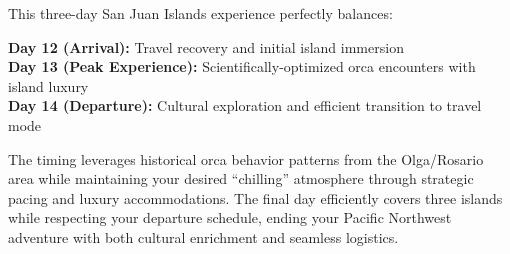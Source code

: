 \documentclass[
  11pt,
  letterpaper,
  DIV=10,
  numbers=noendperiod]{scrartcl}
\begin{document}
This three-day San Juan Islands experience perfectly balances:

\textbf{Day 12 (Arrival):} Travel recovery and initial island
immersion\\
\textbf{Day 13 (Peak Experience):} Scientifically-optimized orca
encounters with island luxury\\
\textbf{Day 14 (Departure):} Cultural exploration and efficient
transition to travel mode

The timing leverages historical orca behavior patterns from the
Olga/Rosario area while maintaining your desired ``chilling'' atmosphere
through strategic pacing and luxury accommodations. The final day
efficiently covers three islands while respecting your departure
schedule, ending your Pacific Northwest adventure with both cultural
enrichment and seamless logistics.
\end{document}
